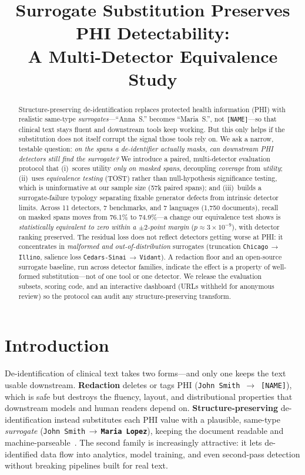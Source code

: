 \documentclass[pmlr,twocolumn,10pt]{jmlr}
\title[Surrogate Substitution Preserves PHI Detectability]{Surrogate Substitution Preserves PHI Detectability:\\ A Multi-Detector Equivalence Study}
\author{\Name{Anonymous Author(s)}}
\newcommand{\oldv}[1]{\textcolor{cclay}{#1}}
\newcommand{\newv}[1]{\textcolor{caccent}{\textbf{#1}}}
\newcommand{\arr}{\,$\rightarrow$\,\allowbreak}
\newcommand{\tp}[1]{\texttt{#1}}
\begin{document}
\maketitle

\begin{abstract}
Structure-preserving de-identification replaces protected health information (PHI) with realistic same-type \emph{surrogates}---``Anna~S.'' becomes ``Maria~S.'', not \tp{[NAME]}---so that clinical text stays fluent and downstream tools keep working. But this only helps if the substitution does not itself corrupt the signal those tools rely on. We ask a narrow, testable question: \emph{on the spans a de-identifier actually masks, can downstream PHI detectors still find the surrogate?} We introduce a paired, multi-detector evaluation protocol that (i)~scores utility \emph{only on masked spans}, decoupling \emph{coverage} from \emph{utility}; (ii)~uses \emph{equivalence testing} (TOST) rather than null-hypothesis significance testing, which is uninformative at our sample size (57k paired spans); and (iii)~builds a surrogate-failure typology separating fixable generator defects from intrinsic detector limits. Across 11 detectors, 7 benchmarks, and 7 languages (1{,}750 documents), recall on masked spans moves from 76.1\% to 74.9\%---a change our equivalence test shows is \emph{statistically equivalent to zero within a $\pm2$-point margin} ($p\approx3\times10^{-9}$), with detector ranking preserved. The residual loss does not reflect detectors getting worse at PHI: it concentrates in \emph{malformed and out-of-distribution} surrogates (truncation \tp{Chicago}\arr\tp{Illino}, salience loss \tp{Cedars-Sinai}\arr\tp{Vidant}). A redaction floor and an open-source surrogate baseline, run across detector families, indicate the effect is a property of well-formed substitution---not of one tool or one detector. We release the evaluation subsets, scoring code, and an interactive dashboard (URLs withheld for anonymous review) so the protocol can audit any structure-preserving transform.
\end{abstract}

\section{Introduction}
De-identification of clinical text takes two forms---and only one keeps the text usable downstream. \textbf{Redaction} deletes or tags PHI (\oldv{\tp{John Smith}}~$\rightarrow$~\tp{[NAME]}), which is safe but destroys the fluency, layout, and distributional properties that downstream models and human readers depend on. \textbf{Structure-preserving} de-identification instead substitutes each PHI value with a plausible, same-type \emph{surrogate} (\oldv{\tp{John Smith}}\arr\newv{\tp{Maria Lopez}}), keeping the document readable and machine-parseable~\citep{carrell2013hiding}. The second family is increasingly attractive: it lets de-identified data flow into analytics, model training, and even second-pass detection without breaking pipelines built for real text.
\end{document}
